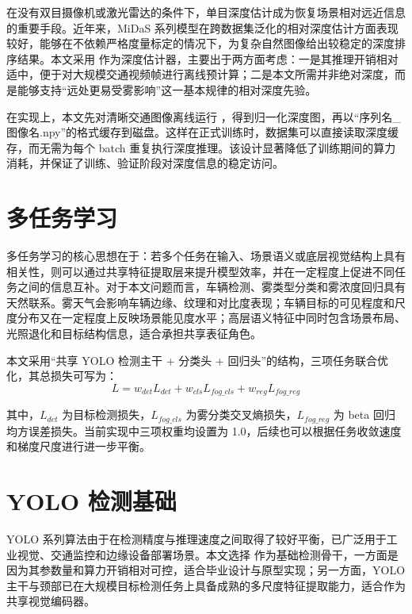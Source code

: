 在没有双目摄像机或激光雷达的条件下，单目深度估计成为恢复场景相对远近信息的重要手段。近年来，MiDaS 系列模型在跨数据集泛化的相对深度估计方面表现较好，能够在不依赖严格度量标定的情况下，为复杂自然图像给出较稳定的深度排序结果\cite{midas}。本文采用  作为深度估计器，主要出于两方面考虑：一是其推理开销相对适中，便于对大规模交通视频帧进行离线预计算；二是本文所需并非绝对深度，而是能够支持“远处更易受雾影响”这一基本规律的相对深度先验。

在实现上，本文先对清晰交通图像离线运行 ，得到归一化深度图，再以“序列名\_图像名.npy”的格式缓存到磁盘。这样在正式训练时，数据集可以直接读取深度缓存，而无需为每个 batch 重复执行深度推理。该设计显著降低了训练期间的算力消耗，并保证了训练、验证阶段对深度信息的稳定访问\cite{midas}。

\section{多任务学习}

多任务学习的核心思想在于：若多个任务在输入、场景语义或底层视觉结构上具有相关性，则可以通过共享特征提取层来提升模型效率，并在一定程度上促进不同任务之间的信息互补\cite{caruana1997multitask}。对于本文问题而言，车辆检测、雾类型分类和雾浓度回归具有天然联系。雾天气会影响车辆边缘、纹理和对比度表现；车辆目标的可见程度和尺度分布又在一定程度上反映场景能见度水平；高层语义特征中同时包含场景布局、光照退化和目标结构信息，适合承担共享表征角色。

本文采用“共享 YOLO 检测主干 + 分类头 + 回归头”的结构，三项任务联合优化，其总损失可写为：
\begin{equation}
L = w_{det}L_{det}+w_{cls}L_{fog\_cls}+w_{reg}L_{fog\_reg}
\end{equation}

其中，\(L_{det}\) 为目标检测损失，\(L_{fog\_cls}\) 为雾分类交叉熵损失，\(L_{fog\_reg}\) 为 beta 回归均方误差损失。当前实现中三项权重均设置为 1.0，后续也可以根据任务收敛速度和梯度尺度进行进一步平衡。

\section{YOLO 检测基础}

YOLO 系列算法由于在检测精度与推理速度之间取得了较好平衡，已广泛用于工业视觉、交通监控和边缘设备部署场景\cite{ultralyticsDocs}。本文选择  作为基础检测骨干，一方面是因为其参数量和算力开销相对可控，适合毕业设计与原型实现；另一方面，YOLO 主干与颈部已在大规模目标检测任务上具备成熟的多尺度特征提取能力，适合作为共享视觉编码器。


